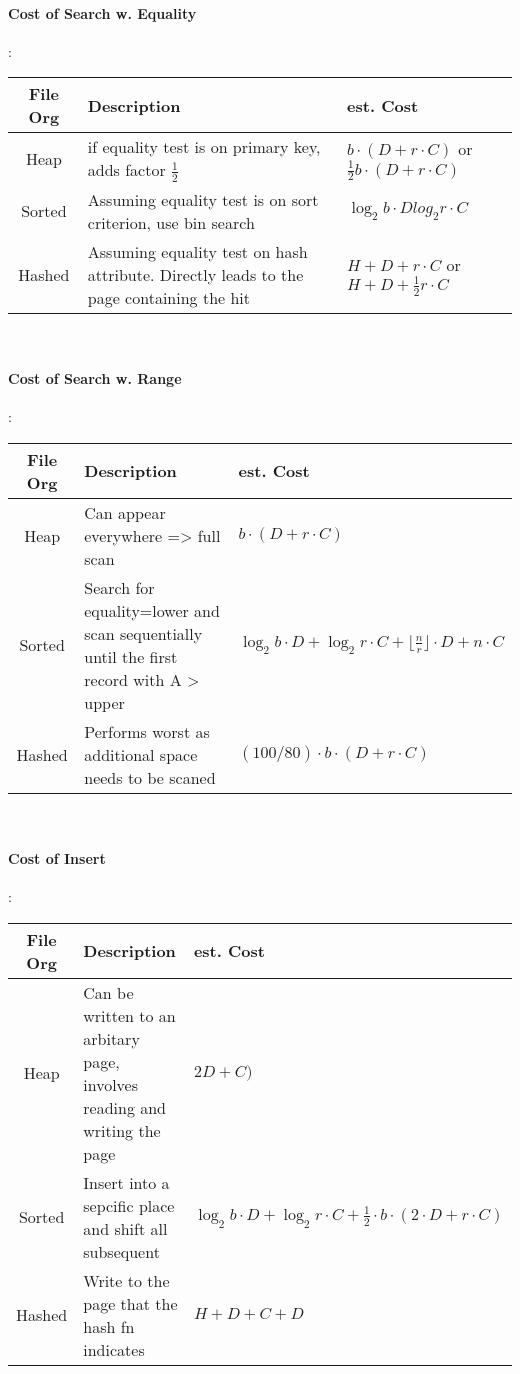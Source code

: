 \documentclass[a4paper]{article}
\begin{document}
\begin{twocolumn}
\paragraph{Cost of Search w. Equality}: \\ 
\begin{tabular}{|c|p{3cm}|p{3cm}|} \hline
	File Org & Description & est. Cost \\ \hline
	Heap & if equality test is on primary key, adds factor $\frac{1}{2}$ & $b \cdot (D + r \cdot C)$ or  $ \frac{1}{2}b \cdot (D + r \cdot C)$ \\ \hline
	Sorted & Assuming equality test is on sort criterion, use bin search & $\log_2 b \cdot D  log_2 r \cdot C$ \\ \hline
	Hashed & Assuming equality test on hash attribute. Directly leads to the page containing the hit & $ H + D + r \cdot C$ or  $ H + D + \frac{1}{2} r \cdot C$ \\ \hline
\end{tabular} \\

\paragraph{Cost of Search w. Range}: \\ 
\begin{tabular}{|c|p{3cm}|p{3cm}|} \hline
	File Org & Description & est. Cost \\ \hline
	Heap & Can appear everywhere => full scan & $b \cdot (D + r \cdot C)$ \\ \hline
	Sorted & Search for equality=lower and scan sequentially until the first record with A > upper & $ \log_2 b \cdot D + \log_2 r \cdot C + \lfloor \frac{n}{r} \rfloor \cdot D + n \cdot C$ \\ \hline
	Hashed & Performs worst as additional space needs to be scaned  & $ (100/80) \cdot b \cdot (D + r \cdot C)$ \\ \hline
\end{tabular} \\

\paragraph{Cost of Insert}:  \\ 
\begin{tabular}{|c|p{3cm}|p{3cm}|} \hline
	File Org & Description & est. Cost \\ \hline
	Heap & Can be written to an arbitary page, involves reading and writing the page & $2D + C)$ \\ \hline
	Sorted & Insert into a sepcific place and shift all subsequent  & $ \log_2 b \cdot D + \log_2 r \cdot C + \frac{1}{2} \cdot b \cdot (2 \cdot D + r \cdot C)$ \\ \hline
	Hashed & Write to the page that the hash fn indicates  & $ H+ D + C + D$ \\ \hline
\end{tabular} \\


\end{twocolumn}
\end{document}
